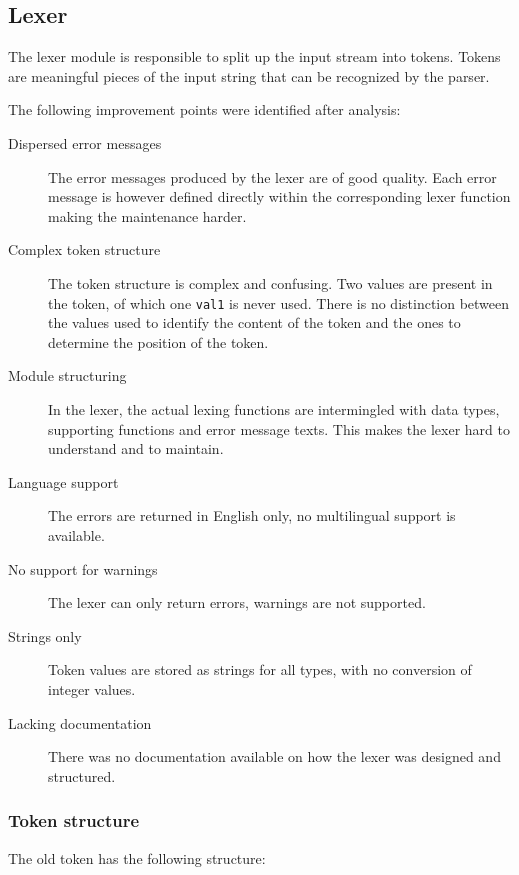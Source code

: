 
\subsection{Lexer}
\label{subsec:analysis-lexer}
The lexer module is responsible to split up the input stream into tokens.
Tokens are meaningful pieces of the input string that can be recognized by the parser.

The following improvement points were identified after analysis:
\begin{description}
  \item[Dispersed error messages]
    The error messages produced by the lexer are of good quality.
    Each error message is however defined directly within the corresponding lexer function making the maintenance harder.
  \item[Complex token structure]
    The token structure is complex and confusing.
    Two values are present in the token, of which one \texttt{val1} is never used.
    There is no distinction between the values used to identify the content of the token and the ones to determine the position of the token.
  \item[Module structuring]
    In the lexer, the actual lexing functions are intermingled with data types, supporting functions and error message texts.
    This makes the lexer hard to understand and to maintain.
  \item[Language support]
    The errors are returned in English only, no multilingual support is available.
  \item[No support for warnings]
    The lexer can only return errors, warnings are not supported. 
  \item[Strings only]
    Token values are stored as strings for all types, with no conversion of integer values.
  \item[Lacking documentation]
    There was no documentation available on how the lexer was designed and structured.
\end{description}


\subsubsection{Token structure}
The old token has the following structure:

